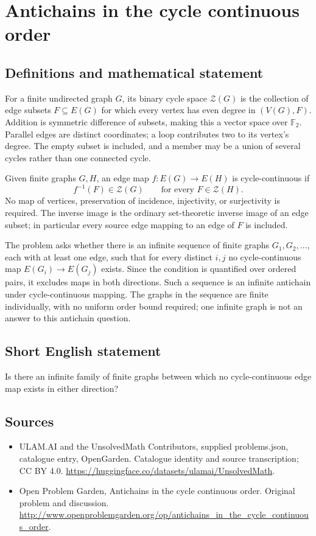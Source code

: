 \documentclass[11pt,a4paper]{article}
\begin{document}
\section*{Antichains in the cycle continuous order}\label{statement}

\subsection{Definitions and mathematical statement}
For a finite undirected graph $G$, its binary cycle space $\mathcal Z(G)$ is the collection of edge subsets $F\subseteq E(G)$ for which every vertex has even degree in $(V(G),F)$. Addition is symmetric difference of subsets, making this a vector space over $\mathbb F_2$. Parallel edges are distinct coordinates; a loop contributes two to its vertex's degree. The empty subset is included, and a member may be a union of several cycles rather than one connected cycle.

Given finite graphs $G,H$, an edge map $f:E(G)\to E(H)$ is cycle-continuous if
\[
            f^{-1}(F)\in\mathcal Z(G)
            \qquad\text{for every }F\in\mathcal Z(H).
\]
No map of vertices, preservation of incidence, injectivity, or surjectivity is required. The inverse image is the ordinary set-theoretic inverse image of an edge subset; in particular every source edge mapping to an edge of $F$ is included.

The problem asks whether there is an infinite sequence of finite graphs $G_1,G_2,\ldots$, each with at least one edge, such that for every distinct $i,j$ no cycle-continuous map $E(G_i)\to E(G_j)$ exists. Since the condition is quantified over ordered pairs, it excludes maps in both directions. Such a sequence is an infinite antichain under cycle-continuous mapping. The graphs in the sequence are finite individually, with no uniform order bound required; one infinite graph is not an answer to this antichain question.
\subsection{Short English statement}
Is there an infinite family of finite graphs between which no cycle-continuous edge map exists in either direction?
\subsection{Sources}
\begin{itemize}
\item[S1] ULAM.AI and the UnsolvedMath Contributors, supplied problems.json, catalogue entry, OpenGarden. Catalogue identity and source transcription; CC BY 4.0.
\url{https://huggingface.co/datasets/ulamai/UnsolvedMath}.
\item[S2] Open Problem Garden, Antichains in the cycle continuous order. Original problem and discussion.
\url{http://www.openproblemgarden.org/op/antichains_in_the_cycle_continuous_order}.
\end{itemize}
\end{document}
